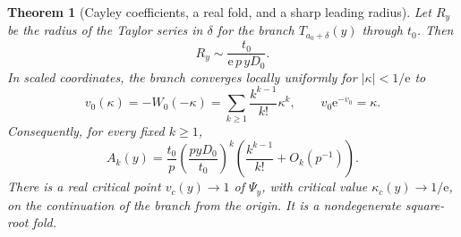 \documentclass[11pt,a4paper]{article}
\numberwithin{equation}{section}
\newtheorem{theorem}{Theorem}[section]
\theoremstyle{definition}
\theoremstyle{remark}
\newcommand{\ee}{\mathrm e}
\begin{document}
\begin{theorem}[Cayley coefficients, a real fold, and a sharp leading radius]
\label{thm:radius}
Let \(R_y\) be the radius of the Taylor series in \(\delta\) for the
branch \(T_{a_0+\delta}(y)\) through \(t_0\). Then
\begin{equation}
 R_y\sim\frac{t_0}{\ee\,p\,yD_0}.
 \label{eq:radius}
\end{equation}
In scaled coordinates, the branch converges locally uniformly for
\(|\kappa|<1/\ee\) to
\begin{equation}
 v_0(\kappa)=-W_0(-\kappa)
       =\sum_{k\ge1}\frac{k^{k-1}}{k!}\kappa^k,
 \qquad v_0\ee^{-v_0}=\kappa.
 \label{eq:lambert-limit}
\end{equation}
Consequently, for every fixed \(k\ge1\),
\begin{equation}
 A_k(y)=\frac{t_0}{p}
   \left(\frac{pyD_0}{t_0}\right)^k
   \left(\frac{k^{k-1}}{k!}+O_k(p^{-1})\right).
 \label{eq:cayley-limit}
\end{equation}
There is a real critical point \(v_c(y)\to1\) of \(\Psi_y\), with
critical value \(\kappa_c(y)\to1/\ee\), on the continuation of the
branch from the origin. It is a nondegenerate square-root fold.
\end{theorem}
\end{document}
